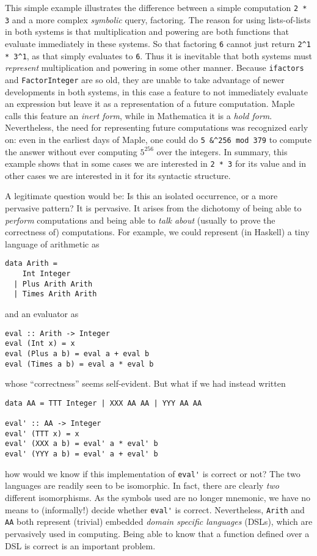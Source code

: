 \documentclass[fleqn]{llncs}
\begin{document}
This simple example illustrates the difference between a simple
computation \texttt{2 * 3} and a more complex \emph{symbolic} query,
factoring.  The reason for using lists-of-lists in both systems is
that multiplication and powering are both functions that evaluate
immediately in these systems.  So that factoring \texttt{6} cannot
just return \verb+2^1 * 3^1+, as that simply evaluates to \texttt{6}.
Thus it is inevitable that both systems must \emph{represent}
multiplication and powering in some other manner.  Because
\texttt{ifactors} and \texttt{FactorInteger} are so old, they are
unable to take advantage of newer developments in both systems, in
this case a feature to not immediately evaluate an expression but
leave it as a representation of a future computation.  Maple calls
this feature an \emph{inert form}, while in Mathematica it is a
\emph{hold form}.  Nevertheless, the need for representing future
computations was recognized early on: even in the earliest days of
Maple, one could do \texttt{5 \&\textasciicircum 256 mod 379} to
compute the answer without ever computing $5^{256}$ over the integers.
In summary, this example shows that in some cases we are interested in
\texttt{2 * 3} for its value and in other cases we are interested in
it for its syntactic structure.

A legitimate question would be: Is this an isolated occurrence, or a
more pervasive pattern? It is pervasive. It arises from the dichotomy
of being able to \emph{perform} computations and being able to
\emph{talk about} (usually to prove the correctness of) computations.
For example, we could represent (in Haskell) a tiny language of
arithmetic as
\begin{lstlisting}
data Arith = 
    Int Integer 
  | Plus Arith Arith 
  | Times Arith Arith
\end{lstlisting}
\noindent and an evaluator as
\begin{lstlisting}
eval :: Arith -> Integer
eval (Int x) = x
eval (Plus a b) = eval a + eval b
eval (Times a b) = eval a * eval b
\end{lstlisting}
\noindent whose ``correctness'' seems self-evident.  But what if we had
instead written
\begin{lstlisting}
data AA = TTT Integer | XXX AA AA | YYY AA AA

eval' :: AA -> Integer
eval' (TTT x) = x
eval' (XXX a b) = eval' a * eval' b
eval' (YYY a b) = eval' a + eval' b
\end{lstlisting}
how would we know if this implementation of \lstinline|eval'| is
correct or not?  The two languages are readily seen to be isomorphic.
In fact, there are clearly \emph{two} different isomorphisms. As the
symbols used are no longer mnemonic, we have no means to (informally!)
decide whether \lstinline|eval'| is correct.  Nevertheless,
\lstinline|Arith| and \lstinline|AA| both represent (trivial) embedded
\emph{domain specific languages} (DSLs), which are pervasively used in
computing. Being able to know that a function defined over a DSL is
correct is an important problem.
\end{document}
